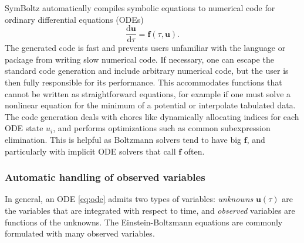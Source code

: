 \documentclass{aa}
\begin{document}
SymBoltz automatically compiles symbolic equations to numerical code for ordinary differential equations (ODEs)
\begin{equation}
    \frac{\mathrm{d}\mathbf{u}}{\mathrm{d} \tau} = \mathbf{f}(\tau,\mathbf{u}).
    \label{eq:ode}
\end{equation}
The generated code is fast and prevents users unfamiliar with the language or package from writing slow numerical code.
If necessary, one can escape the standard code generation and include arbitrary numerical code, but the user is then fully responsible for its performance.
This accommodates functions that cannot be written as straightforward equations, for example if one must solve a nonlinear equation for the minimum of a potential or interpolate tabulated data.
The code generation deals with chores like dynamically allocating indices for each ODE state $u_i$, and performs optimizations such as common subexpression elimination.
This is helpful as Boltzmann solvers tend to have big $\boldsymbol{f}$, and particularly with implicit ODE solvers that call $\boldsymbol{f}$ often.

\subsubsection{Automatic handling of observed variables}
\label{sec:observed}

In general, an ODE \eqref{eq:ode} admits two types of variables: \textit{unknowns} $\mathbf{u}(\tau)$ are the variables that are integrated with respect to time, and \textit{observed} variables are functions of the unknowns.
The Einstein-Boltzmann equations are commonly formulated with many observed variables.
\end{document}
